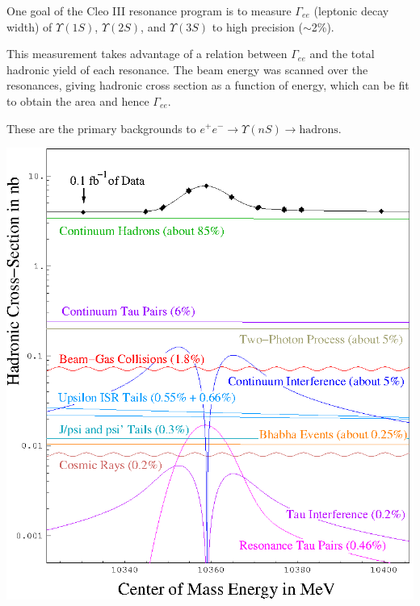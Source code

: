 One goal of the {\sc Cleo III} resonance program is to measure
$\Gamma_{ee}$ (leptonic decay width) of $\Upsilon(1S)$,
$\Upsilon(2S)$, and $\Upsilon(3S)$ to high precision ($\sim$2\%).

This measurement takes advantage of a relation between $\Gamma_{ee}$
and the total hadronic yield of each resonance.  The beam energy was
scanned over the resonances, giving hadronic cross section as a
function of energy, which can be fit to obtain the area and hence
$\Gamma_{ee}$.

These are the primary backgrounds to $e^+ e^- \to \Upsilon(nS) \to
\mbox{hadrons}$.

\vfill

\begin{minipage}{6in}
\begin{center}
\huge {}
\end{center}

\vspace{0.25cm}
\hspace{-0.25cm}
\begin{center}
  \includegraphics[width=\linewidth]{pivarski1.eps}
\end{center}

\end{minipage}

